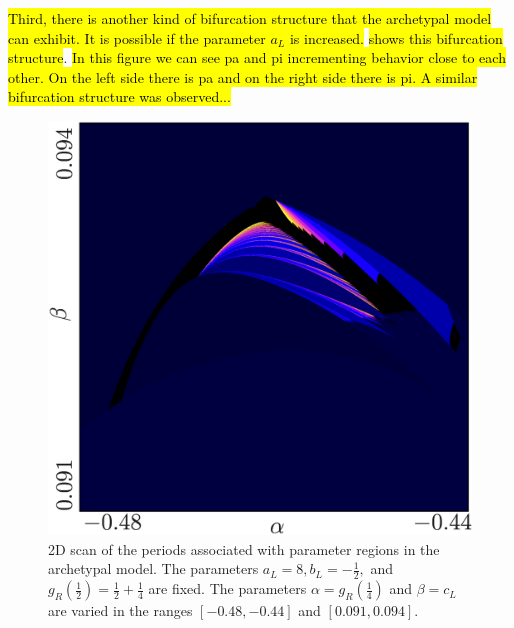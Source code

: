 \hl{
	Third, there is another kind of bifurcation structure that the archetypal model can exhibit.
	It is possible if the parameter $a_L$ is increased.
}
 \hl{shows this bifurcation structure}.
\hl{
	In this figure we can see \gls{pa} and \gls{pi} incrementing behavior close to each other.
	On the left side there is \gls{pa} and on the right side there is \gls{pi}.
	A similar bifurcation structure was observed...
}

\begin{figure}
	\centering
	\includegraphics[width=.7 \textwidth]{../Figures/8/8.1/result.png}
	\caption[2D scan of the periods associated with parameter regions in the archetypal model]{
		2D scan of the periods associated with parameter regions in the archetypal model.
		The parameters $a_L = 8, b_L = -\frac{1}{2},$ and $g_R\left(\frac{1}{2}\right) = \frac{1}{2} + \frac{1}{4}$ are fixed.
		The parameters $\alpha = g_R\left(\frac{1}{4}\right)$ and $\beta = c_L$ are varied in the ranges $[-0.48, -0.44]$ and $[0.091, 0.094]$.
	}
	\label{fig:concl.fut.addincr}
\end{figure}
